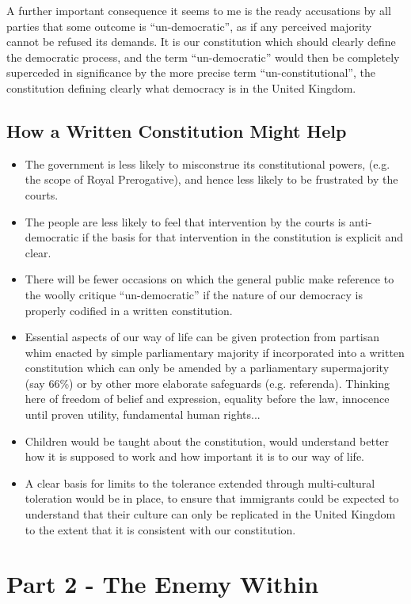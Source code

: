 \documentclass[14pt,titlepage]{extarticle}
\begin{document}
A further important consequence it seems to me is the ready accusations by all parties that some outcome is ``un-democratic'', as if any perceived majority cannot be refused its demands.
It is our constitution which should clearly define the democratic process, and the term ``un-democratic'' would then be completely superceded in significance by the more precise term ``un-constitutional'', the constitution defining clearly what democracy is in the United Kingdom.

\subsection{How a Written Constitution Might Help}

\begin{itemize}
\item The government is less likely to misconstrue its constitutional powers, (e.g. the scope of Royal Prerogative), and hence less likely to be frustrated by the courts.
\item The people are less likely to feel that intervention by the courts is anti-democratic if the basis for that intervention in the constitution is explicit and clear.
\item There will be fewer occasions on which the general public make reference to the woolly critique ``un-democratic'' if the nature of our democracy is properly codified in a written constitution.
\item Essential aspects of our way of life can be given protection from partisan whim enacted by simple parliamentary majority if incorporated into a written constitution which can only be amended by a parliamentary supermajority (say 66\%) or by other more elaborate safeguards (e.g. referenda).
  Thinking here of freedom of belief and expression, equality before the law, innocence until proven utility, fundamental human rights...
\item Children would be taught about the constitution, would understand better how it is supposed to work and how important it is to our way of life.
\item A clear basis for limits to the tolerance extended through multi-cultural toleration would be in place, to ensure that immigrants could be expected to understand that their culture can only be replicated in the United Kingdom to the extent that it is consistent with our constitution.
\end{itemize}


\section{Part 2 - The Enemy Within}
\end{document}
